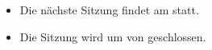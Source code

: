  \begin{itemize}
    \item {Die nächste Sitzung findet am \textbf{\meetingNext} statt.}
    \item {Die Sitzung wird um \textbf{\meetingEndTime} von \textbf{\chair} geschlossen.}
  \end{itemize}
